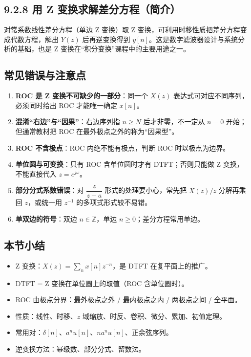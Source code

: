 \subsection{9.2.8 用 Z
变换求解差分方程（简介）}\label{ux7528-z-ux53d8ux6362ux6c42ux89e3ux5deeux5206ux65b9ux7a0bux7b80ux4ecb}

对常系数线性差分方程（单边 Z 变换）取 Z
变换，可利用时移性质把差分方程变成代数方程，解出 \(Y(z)\) 后再逆变换得到
\(y[n]\)。这是数字滤波器设计与系统分析的基础，也是 Z
变换在``积分变换''课程中的主要用途之一。

\subsection{常见错误与注意点}\label{ux5e38ux89c1ux9519ux8befux4e0eux6ce8ux610fux70b9-26}

\begin{enumerate}
\def\labelenumi{\arabic{enumi}.}
\tightlist
\item
  \textbf{ROC 是 Z 变换不可缺少的一部分}：同一个 \(X(z)\)
  表达式可对应不同序列，必须同时给出 ROC 才能唯一确定 \(x[n]\)。
\item
  \textbf{混淆``右边''与``因果''}：右边序列指 \(n\ge N\)
  后才非零，不一定从 \(n=0\) 开始；但通常教材把 ROC
  在最外极点之外的称为``因果型''。
\item
  \textbf{ROC 不含极点}：ROC 内绝不能有极点，判断 ROC 时以极点为边界。
\item
  \textbf{单位圆与可变换}：只有 ROC 含单位圆时才有 DTFT；否则只能做 Z
  变换，不能直接代入 \(z=e^{j\omega}\)。
\item
  \textbf{部分分式系数错误}：对 \(\dfrac{z}{z-a}\)
  形式的处理要小心，常先把 \(X(z)/z\) 分解再乘回 \(z\)，或统一用
  \(z^{-1}\) 的多项式形式较不易错。
\item
  \textbf{单双边的符号}：双边 \(n\in\mathbb{Z}\)，单边
  \(n\ge0\)；差分方程常用单边。
\end{enumerate}

\subsection{本节小结}\label{ux672cux8282ux5c0fux7ed3-26}

\begin{itemize}
\tightlist
\item
  Z 变换：\(X(z)=\sum_n x[n]z^{-n}\)，是 DTFT 在复平面上的推广。
\item
  DTFT = Z 变换在单位圆上的取值（ROC 含单位圆时）。
\item
  ROC 由极点分界：最外极点之外 / 最内极点之内 / 两极点之间 / 全平面。
\item
  性质：线性、时移、\(z\) 域缩放、时反、卷积、微分、累加、初值定理。
\item
  常用对：\(\delta[n]\)、\(a^n u[n]\)、\(n a^n u[n]\)、正余弦序列。
\item
  逆变换方法：幂级数、部分分式、留数法。
\end{itemize}

